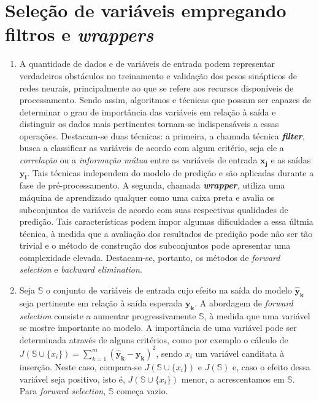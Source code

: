 			\section {Seleção de variáveis empregando filtros e \textit{wrappers}}
			
			\begin{enumerate}
			  \item A quantidade de dados e de variáveis de entrada podem representar
			  verdadeiros obstáculos no treinamento e validação dos pesos sinápticos de
			  redes neurais, principalmente ao que se refere aos recursos disponíveis de
			  processamento. Sendo assim, algoritmos e técnicas que possam ser capazes de
			  determinar o grau de importância das variáveis em relação à saída e
			  distinguir os dados mais pertinentes tornam-se indispensáveis a essas
			  operações. Destacam-se duas técnicas: a primeira, a chamada técnica
			  \textit{\textbf{filter}}, busca a classificar as variáveis de acordo com
			  algum critério, seja ele a \textit{correlação} ou a \textit{informação mútua}
			  entre as variáveis de entrada \(\boldsymbol{x_j} \) e as saídas
			  \(\boldsymbol{y_i} \). Tais técnicas independem do modelo de predição e são
			  aplicadas durante a fase de pré-processamento.  A segunda, chamada
			  \textit{\textbf{wrapper}}, utiliza uma máquina de aprendizado qualquer como
			  uma caixa preta e avalia os subconjuntos de variáveis de acordo com suas
			  respectivas qualidades de predição. Tais características podem impor algumas
			  dificuldades a essa últmia técnica, à medida que a avaliação dos resultados
			  de predição pode não ser tão trivial e o método de construção dos
			  subconjuntos pode apresentar uma complexidade elevada. Destacam-se, portanto,
			  os métodos de \textit{forward selection} e \textit{backward elimination}.
			  
			  
			  \item Seja \(\mathbb{S}\) o conjunto de variáveis de entrada cujo efeito na
			  saída do modelo \(\boldsymbol{\hat{y}_k}\) seja pertinente em relação à saída esperada
			  \(\boldsymbol{y_k}\).  A abordagem de \textit{forward selection} consiste a
			  aumentar progressivamente \(\mathbb{S}\), à medida que uma variável se mostre
			  importante ao modelo. A importância de uma variável pode ser determinada
			  através de alguns critérios, como por exemplo o cálculo de 
			  \(J\left(\mathbb{S} \cup \{ x_i \} \right) = \sum_{k=1}^{m}(\boldsymbol{\hat{y}_k} -
			  \boldsymbol{y_k})^2 \), sendo \(x_i\) um variável canditata à
			  inserção. Neste caso, compara-se \(J\left(\mathbb{S} \cup \{ x_i \} \right)\) e
			  \(J\left(\mathbb{S} \right)\) e, caso o efeito dessa variável seja positivo, isto é,
			  \(J\left(\mathbb{S} \cup \{ x_i \} \right)\) menor, a acrescentamos em \(\mathbb{S}\). Para
			  \textit{forward selection}, \(\mathbb{S}\) começa vazio.
			  

\end{enumerate}
